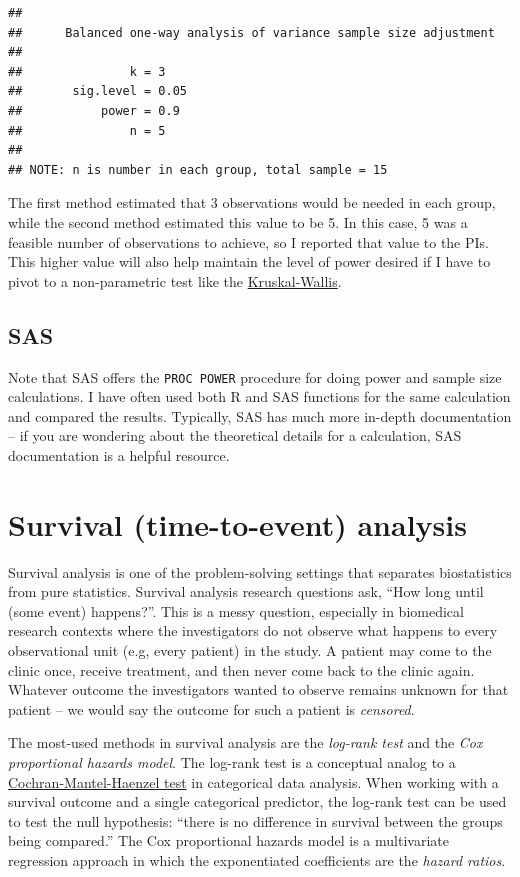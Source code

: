 \documentclass[
]{book}
\begin{document}
\begin{verbatim}
## 
##      Balanced one-way analysis of variance sample size adjustment 
## 
##               k = 3
##       sig.level = 0.05
##           power = 0.9
##               n = 5
## 
## NOTE: n is number in each group, total sample = 15
\end{verbatim}

The first method estimated that 3 observations would be needed in each group, while the second method estimated this value to be 5. In this case, 5 was a feasible number of observations to achieve, so I reported that value to the PIs. This higher value will also help maintain the level of power desired if I have to pivot to a non-parametric test like the \href{https://en.wikipedia.org/wiki/Kruskal\%E2\%80\%93Wallis_one-way_analysis_of_variance}{Kruskal-Wallis}.

\hypertarget{sas}{%
\section{SAS}\label{sas}}

Note that SAS offers the \texttt{PROC\ POWER} procedure for doing power and sample size calculations. I have often used both R and SAS functions for the same calculation and compared the results. Typically, SAS has much more in-depth documentation -- if you are wondering about the theoretical details for a calculation, SAS documentation is a helpful resource.

\hypertarget{survival-time-to-event-analysis}{%
\chapter{Survival (time-to-event) analysis}\label{survival-time-to-event-analysis}}

Survival analysis is one of the problem-solving settings that separates biostatistics from pure statistics. Survival analysis research questions ask, ``How long until (some event) happens?''. This is a messy question, especially in biomedical research contexts where the investigators do not observe what happens to every observational unit (e.g, every patient) in the study. A patient may come to the clinic once, receive treatment, and then never come back to the clinic again. Whatever outcome the investigators wanted to observe remains unknown for that patient -- we would say the outcome for such a patient is \emph{censored}.

The most-used methods in survival analysis are the \emph{log-rank test} and the \emph{Cox proportional hazards model}. The log-rank test is a conceptual analog to a \href{https://en.wikipedia.org/wiki/Cochran\%E2\%80\%93Mantel\%E2\%80\%93Haenszel_statistics}{Cochran-Mantel-Haenzel test} in categorical data analysis. When working with a survival outcome and a single categorical predictor, the log-rank test can be used to test the null hypothesis: ``there is no difference in survival between the groups being compared.'' The Cox proportional hazards model is a multivariate regression approach in which the exponentiated coefficients are the \emph{hazard ratios}.
\end{document}
